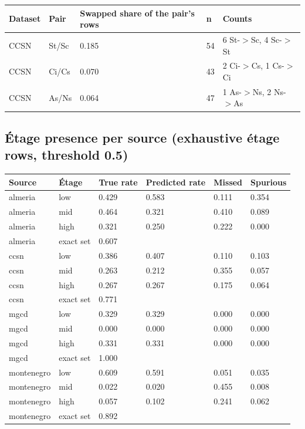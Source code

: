 \begin{center}{\scriptsize\setlength{\tabcolsep}{3pt}
\begin{tabular}{llp{12.6cm}ll}
\toprule
Dataset & Pair & Swapped share of the pair's rows & n & Counts \\
\midrule
CCSN & St/Sc & 0.185 & 54 & 6 St-$>$Sc, 4 Sc-$>$St \\
CCSN & Ci/Cs & 0.070 & 43 & 2 Ci-$>$Cs, 1 Cs-$>$Ci \\
CCSN & As/Ns & 0.064 & 47 & 1 As-$>$Ns, 2 Ns-$>$As \\
\bottomrule
\end{tabular}}
\end{center}

\subsection{Étage presence per source (exhaustive étage rows, threshold 0.5)}

\begin{center}{\scriptsize\setlength{\tabcolsep}{3pt}
\begin{tabular}{llllll}
\toprule
Source & Étage & True rate & Predicted rate & Missed & Spurious \\
\midrule
almeria & low & 0.429 & 0.583 & 0.111 & 0.354 \\
almeria & mid & 0.464 & 0.321 & 0.410 & 0.089 \\
almeria & high & 0.321 & 0.250 & 0.222 & 0.000 \\
almeria & exact set & 0.607 &  &  &  \\
ccsn & low & 0.386 & 0.407 & 0.110 & 0.103 \\
ccsn & mid & 0.263 & 0.212 & 0.355 & 0.057 \\
ccsn & high & 0.267 & 0.267 & 0.175 & 0.064 \\
ccsn & exact set & 0.771 &  &  &  \\
mgcd & low & 0.329 & 0.329 & 0.000 & 0.000 \\
mgcd & mid & 0.000 & 0.000 & 0.000 & 0.000 \\
mgcd & high & 0.331 & 0.331 & 0.000 & 0.000 \\
mgcd & exact set & 1.000 &  &  &  \\
montenegro & low & 0.609 & 0.591 & 0.051 & 0.035 \\
montenegro & mid & 0.022 & 0.020 & 0.455 & 0.008 \\
montenegro & high & 0.057 & 0.102 & 0.241 & 0.062 \\
montenegro & exact set & 0.892 &  &  &  \\
\bottomrule
\end{tabular}}
\end{center}

